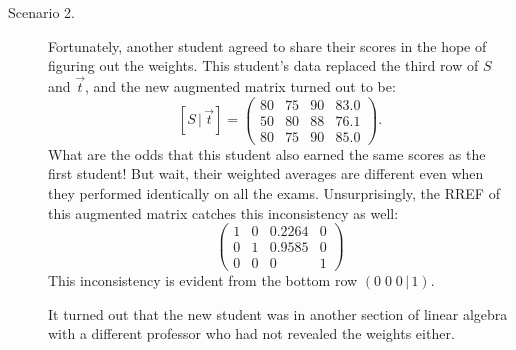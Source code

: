 \documentclass{ximera}
\begin{document}
\begin{example}
\begin{description}
  \item[Scenario 2.] Fortunately, another student agreed to share
    their scores in the hope of figuring out the weights. This
    student's data replaced the third row of $S$ and $\vec{t}$, and
    the new augmented matrix turned out to be:
    \[
      [S \,|\, \vec{t}] =
      \left(
        \begin{array}{ccc|c}
          80 & 75 & 90 & 83.0 \\
          50 & 80 & 88 & 76.1 \\
          80 & 75 & 90 & 85.0
        \end{array}
      \right).
    \]
    What are the odds that this student also earned the same scores as
    the first student! But wait, their weighted averages are different
    even when they performed identically on all the
    exams. Unsurprisingly, the RREF of this augmented matrix catches
    this inconsistency as well:
    \[
      \left(
        \begin{array}{ccc|c}
          1 & 0 & 0.2264 & 0 \\
          0 & 1 & 0.9585 & 0 \\
          0 & 0 & 0 & 1
        \end{array}
      \right)
    \]
    This inconsistency is evident from the bottom row
    $(0 \; 0 \; 0 \,|\, 1)$.

    It turned out that the new student was in another section of
    linear algebra with a different professor who had not revealed the
    weights either.


\end{description}
\end{example}
\end{document}
